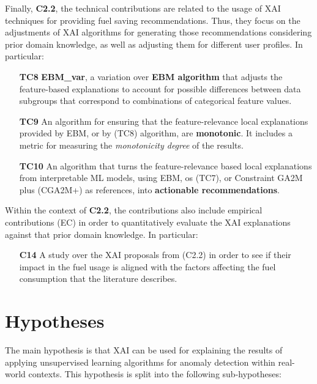 Finally, \textbf{C2.2}, the technical contributions are related to the usage of XAI techniques for providing fuel saving recommendations. Thus, they focus on the adjustments of XAI algorithms for generating those recommendations considering prior domain knowledge, as well as adjusting them for different user profiles. In particular:
\begin{itemize}
\item[\textbf{TC8}] \textbf{EBM\_var}, a variation over \textbf{EBM algorithm} that adjusts the feature-based explanations to account for possible differences between data subgroups that correspond to combinations of categorical feature values.
\item[\textbf{TC9}] An algorithm for ensuring that the feature-relevance local explanations provided by EBM, or by (TC8) algorithm, are \textbf{monotonic}. It includes a metric for measuring the \textit{monotonicity degree} of the results.
\item[\textbf{TC10}] An algorithm that turns the feature-relevance based local explanations from interpretable ML models, using EBM, os (TC7), or Constraint GA2M plus (CGA2M+) as references, into \textbf{actionable recommendations}.

\end{itemize}

Within the context of \textbf{C2.2}, the contributions also include empirical contributions (EC) in order to quantitatively evaluate the XAI explanations against that prior domain knowledge. In particular:
\begin{itemize}
\item[\textbf{C14}] A study over the XAI proposals from (C2.2) in order to see if their impact in the fuel usage is aligned with the factors affecting the fuel consumption that the literature describes.

\end{itemize}


\section{Hypotheses}\label{sec:Hypotheses}
The main hypothesis is that XAI can be used for explaining the results of applying unsupervised learning algorithms for anomaly detection within real-world contexts. This hypothesis is split into the following sub-hypotheses:

